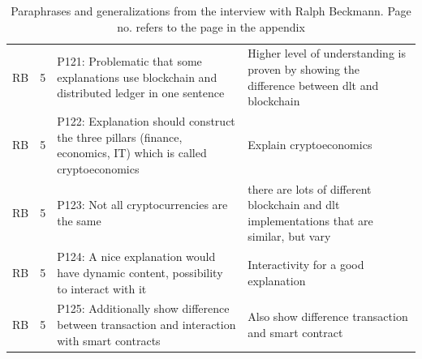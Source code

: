 \begin{table}[H]
\begin{tabularx}{\textwidth}{ll|X|p{4.5cm}}
	RB & 5 & P121: Problematic that some explanations use blockchain and distributed ledger in one sentence & Higher level of understanding is proven by showing the difference between dlt and blockchain   \\  
	RB & 5 & P122: Explanation should construct the three pillars (finance, economics, IT) which is called cryptoeconomics & Explain cryptoeconomics   \\  
	RB & 5 & P123: Not all cryptocurrencies are the same & there are lots of different blockchain and dlt implementations that are similar, but vary   \\  
	RB & 5 & P124: A nice explanation would have dynamic content, possibility to interact with it & Interactivity for a good explanation   \\  
	RB & 5 & P125: Additionally show difference between transaction and interaction with smart contracts & Also show difference transaction and smart contract   \\  
    \end{tabularx}
    \caption{Paraphrases and generalizations from the interview with Ralph Beckmann. Page no. refers to the page in the appendix}
    \label{tab:my_label}
\end{table}

